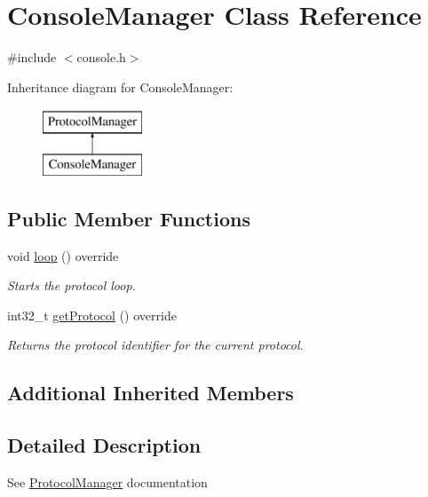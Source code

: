 \hypertarget{classConsoleManager}{}\section{Console\+Manager Class Reference}
\label{classConsoleManager}


{\ttfamily \#include $<$console.\+h$>$}

Inheritance diagram for Console\+Manager\+:\begin{figure}[H]
\begin{center}
\leavevmode
\includegraphics[height=2.000000cm]{classConsoleManager}
\end{center}
\end{figure}
\subsection*{Public Member Functions}
\begin{DoxyCompactItemize}
\item 
void \mbox{\hyperlink{classConsoleManager_a69261543a87cf7d3c7ec004c566145fd}{loop}} () override
\begin{DoxyCompactList}\small\item\em Starts the protocol loop. \end{DoxyCompactList}\item 
int32\+\_\+t \mbox{\hyperlink{classConsoleManager_a12c11521d46af302d6c7d79d3b8174b4}{get\+Protocol}} () override
\begin{DoxyCompactList}\small\item\em Returns the protocol identifier for the current protocol. \end{DoxyCompactList}\end{DoxyCompactItemize}
\subsection*{Additional Inherited Members}


\subsection{Detailed Description}
See \mbox{\hyperlink{classProtocolManager}{Protocol\+Manager}} documentation 

